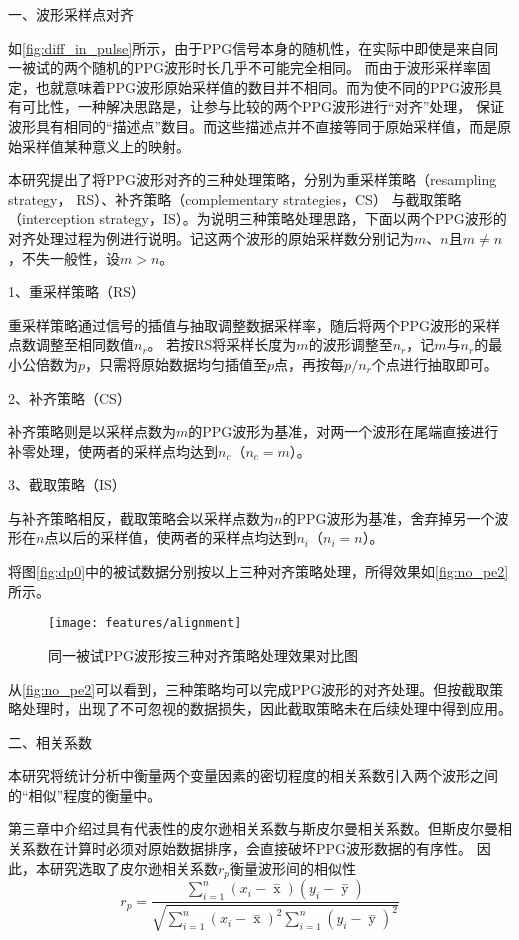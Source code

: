 一、波形采样点对齐

如\autoref{fig:diff_in_pulse}所示，由于PPG信号本身的随机性，在实际中即使是来自同一被试的两个随机的PPG波形时长几乎不可能完全相同\cite{Qiu2012,PPGYY}。
而由于波形采样率固定，也就意味着PPG波形原始采样值的数目并不相同。而为使不同的PPG波形具有可比性，一种解决思路是，让参与比较的两个PPG波形进行“对齐”处理，
保证波形具有相同的“描述点”数目。而这些描述点并不直接等同于原始采样值，而是原始采样值某种意义上的映射。

本研究提出了将PPG波形对齐的三种处理策略，分别为重采样策略（resampling strategy， RS）、补齐策略（complementary strategies，CS）
与截取策略（interception strategy，IS）。为说明三种策略处理思路，下面以两个PPG波形的对齐处理过程为例进行说明。记这两个波形的原始采样数分别记为$m$、$n$且$m \neq n$，不失一般性，设$m>n$。

1、重采样策略（RS）

重采样策略通过信号的插值与抽取调整数据采样率，随后将两个PPG波形的采样点数调整至相同数值$n_r$。
若按RS将采样长度为$m$的波形调整至$n_r$，记$m$与$n_r$的最小公倍数为$p$，只需将原始数据均匀插值至$p$点，再按每$p/n_r$个点进行抽取即可。

2、补齐策略（CS）

补齐策略则是以采样点数为$m$的PPG波形为基准，对两一个波形在尾端直接进行补零处理，使两者的采样点均达到$n_c$（$n_c=m$）。

3、截取策略（IS）

与补齐策略相反，截取策略会以采样点数为$n$的PPG波形为基准，舍弃掉另一个波形在$n$点以后的采样值，使两者的采样点均达到$n_i$（$n_i=n$）。

将图\autoref{fig:dp0}中的被试数据分别按以上三种对齐策略处理，所得效果如\autoref{fig:no_pe2}所示。

\begin{figure}[htbp]
    \centering
    \texttt{[image: features/alignment]}
    \caption{\label{fig:no_pe2}同一被试PPG波形按三种对齐策略处理效果对比图}
\end{figure}

从\autoref{fig:no_pe2}可以看到，三种策略均可以完成PPG波形的对齐处理。但按截取策略处理时，出现了不可忽视的数据损失，因此截取策略未在后续处理中得到应用。

二、相关系数

本研究将统计分析中衡量两个变量因素的密切程度的相关系数引入两个波形之间的“相似”程度的衡量中。

第三章中介绍过具有代表性的皮尔逊相关系数与斯皮尔曼相关系数。但斯皮尔曼相关系数在计算时必须对原始数据排序，会直接破坏PPG波形数据的有序性。
因此，本研究选取了皮尔逊相关系数$r_p$衡量波形间的相似性
\begin{equation}
    \label{equ:pearson2}
    r_p=\frac{\sum_{i=1}^n{(x_i- \mathop{x} \limits^-)(y_i- \mathop{y} \limits^-)}}{\sqrt{{\sum_{i=1}^n}{{(x_i- \mathop{x} \limits^-)^2\sum_{i=1}^n}{(y_i- \mathop{y} \limits^-)^2}}}}
\end{equation}

